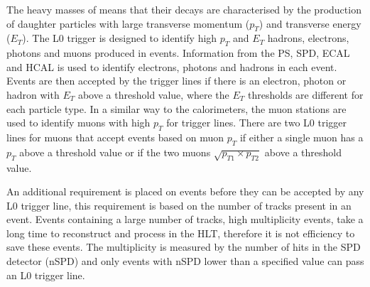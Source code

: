


The heavy masses of \bhadrons means that their decays are characterised by the production of daughter particles with large transverse momentum ($p_{T}$) and transverse energy ($E_{T}$).
The L0 trigger is designed to identify high $p_{T}$ and $E_{T}$ hadrons, electrons, photons and muons produced in events. 
Information from the PS, SPD, ECAL and HCAL is used to identify electrons, photons and hadrons in each event. Events are then accepted by the trigger lines if there is an electron, photon or hadron with $E_{T}$ above a threshold value, where the $E_{T}$ thresholds are different for each particle type. %
In a similar way to the calorimeters, the muon stations are used to identify muons with high $p_{T}$ for trigger lines. There are two L0 trigger lines for muons that accept events based on muon $p_{T}$ if either a single muon has a $p_{T}$ above a threshold value or if the two muons $\sqrt{p_{T1} \times p_{T2}}$ above a threshold value.

An additional requirement is placed on events before they can be accepted by any L0 trigger line, this requirement is based on the number of tracks present in an event.
Events containing a large number of tracks, high multiplicity events, take a long time to reconstruct and process in the HLT, therefore it is not efficiency to save these events.
The multiplicity is measured by the number of hits in the SPD detector (nSPD) and only events with nSPD lower than a specified value can pass an L0 trigger line.




